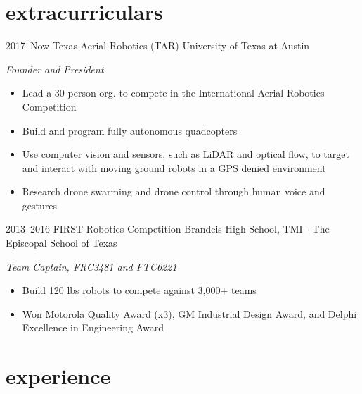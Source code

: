 \documentclass[]{friggeri-cv} %
\begin{document}
\vspace{-11pt}
\section{extracurriculars}
\vspace{-7pt}

\begin{entrylist}

	\entry
	{2017--Now}
	{Texas Aerial Robotics (TAR)}
	{University of Texas at Austin}
	{
	\emph{Founder and President}
	\begin{itemize}
			\item Lead a 30 person org. to compete in the International Aerial Robotics Competition
			\item Build and program fully autonomous quadcopters
			\item Use computer vision and sensors, such as LiDAR and optical flow, to target and interact with moving ground robots in a GPS denied environment
			\item Research drone swarming and drone control through human voice and gestures
		\end{itemize}
	}


	\entry
	{2013--2016}
	{FIRST Robotics Competition}
	{Brandeis High School, TMI - The Episcopal School of Texas}
	{
	\emph{Team Captain, FRC3481 and FTC6221}
	\begin{itemize}
			\item Build 120 lbs robots to compete against 3,000+ teams
			\item Won Motorola Quality Award (x3), GM Industrial Design Award, and Delphi Excellence in Engineering Award
		\end{itemize}
	}

\end{entrylist}


\vspace{-11pt}
\section{experience}
\vspace{-7pt}
\end{document}
